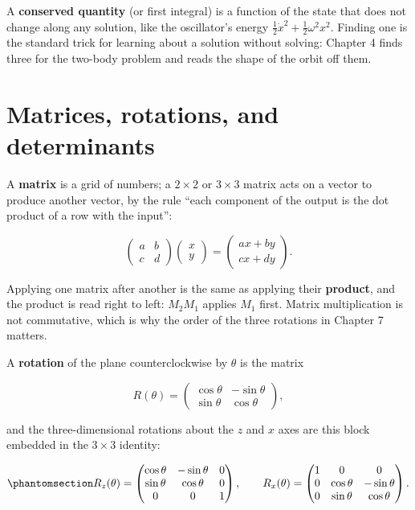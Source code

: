 \documentclass[
  10.5pt,
  letterpaper,
]{scrbook}
\theoremstyle{plain}
\theoremstyle{remark}
\begin{document}
A \textbf{conserved quantity} (or first integral) is a function of the
state that does not change along any solution, like the oscillator's
energy \(\tfrac12\dot x^2 + \tfrac12\omega^2 x^2\). Finding one is the
standard trick for learning about a solution without solving: Chapter 4
finds three for the two-body problem and reads the shape of the orbit
off them.

\section{Matrices, rotations, and
determinants}\label{matrices-rotations-and-determinants}

A \textbf{matrix} is a grid of numbers; a \(2\times2\) or \(3\times3\)
matrix acts on a vector to produce another vector, by the rule ``each
component of the output is the dot product of a row with the input'':

\[
\begin{pmatrix} a & b \\ c & d \end{pmatrix}\begin{pmatrix} x \\ y \end{pmatrix} = \begin{pmatrix} ax + by \\ cx + dy \end{pmatrix}.
\]

Applying one matrix after another is the same as applying their
\textbf{product}, and the product is read right to left: \(M_2 M_1\)
applies \(M_1\) first. Matrix multiplication is not commutative, which
is why the order of the three rotations in Chapter 7 matters.

A \textbf{rotation} of the plane counterclockwise by \(\theta\) is the
matrix

\[
R(\theta) = \begin{pmatrix} \cos\theta & -\sin\theta \\ \sin\theta & \cos\theta \end{pmatrix},
\]

and the three-dimensional rotations about the \(z\) and \(x\) axes are
this block embedded in the \(3\times3\) identity:

\begin{equation}\protect\phantomsection\label{eq-rotation-matrices}{
R_z(\theta) = \begin{pmatrix} \cos\theta & -\sin\theta & 0 \\ \sin\theta & \cos\theta & 0 \\ 0 & 0 & 1 \end{pmatrix}, \qquad
R_x(\theta) = \begin{pmatrix} 1 & 0 & 0 \\ 0 & \cos\theta & -\sin\theta \\ 0 & \sin\theta & \cos\theta \end{pmatrix}.
}\end{equation}
\end{document}
